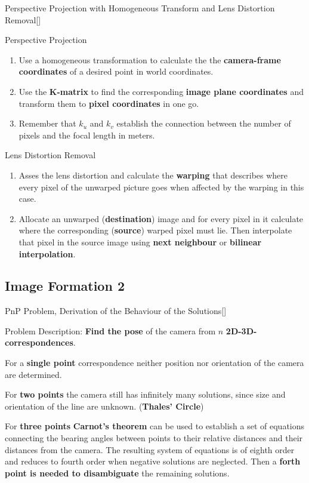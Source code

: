 \documentclass[10pt,a4paper]{scrartcl}
\begin{document}
\begin{multicols*}{2}
\begin{QandA}{Perspective Projection with Homogeneous Transform and Lens Distortion Removal}[\Derivation]
\item Perspective Projection
\begin{enumerate}
\item Use a homogeneous transformation to calculate the the \textbf{camera-frame coordinates} of a desired point in world coordinates.
\item Use the \textbf{K-matrix} to find the corresponding \textbf{image plane coordinates} and transform them to \textbf{pixel coordinates} in one go.
\item Remember that $k_u$ and $k_v$ establish the connection between the number of pixels and the focal length in meters.
\end{enumerate}
\item Lens Distortion Removal
\begin{enumerate}
\item Asses the lens distortion and calculate the \textbf{warping} that describes where every pixel of the unwarped picture goes when affected by the warping in this case.
\item Allocate an unwarped (\textbf{destination}) image and for every pixel in it calculate where the corresponding (\textbf{source}) warped pixel must lie. Then interpolate that pixel in the source image using \textbf{next neighbour} or \textbf{bilinear interpolation}.
\end{enumerate}
\end{QandA}

\subsection*{Image Formation 2}

\begin{QandA}{PnP Problem, Derivation of the Behaviour of the Solutions}[\Definition]
\item Problem Description: \textbf{Find the pose} of the camera from $n$ \textbf{2D-3D-correspondences}.
\item For a \textbf{single point} correspondence neither position nor orientation of the camera are determined.
\item For \textbf{two points} the camera still has infinitely many solutions, since size and orientation of the line are unknown. (\textbf{Thales' Circle})
\item For \textbf{three points} \textbf{Carnot's theorem} can be used to establish a set of equations connecting the bearing angles between points to their relative distances and their distances from the camera. The resulting system of equations is of eighth order and reduces to fourth order when negative solutions are neglected. Then a \textbf{forth point is needed to disambiguate} the remaining solutions. 
\end{QandA}


\end{multicols*}
\end{document}
